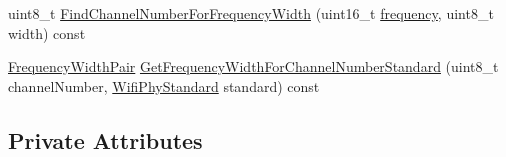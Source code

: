 \begin{DoxyCompactItemize}
\item 
uint8\+\_\+t \hyperlink{classns3_1_1WifiPhy_ac1a2644035e5ec7129ec1a1583face8a}{Find\+Channel\+Number\+For\+Frequency\+Width} (uint16\+\_\+t \hyperlink{mmwave_2model_2fading-traces_2fading__trace__generator_8m_a09045328d6d7e16aa4013f526cc6993d}{frequency}, uint8\+\_\+t width) const 
\item 
\hyperlink{classns3_1_1WifiPhy_abb7b47ebed22c2703bcc239729d1e40c}{Frequency\+Width\+Pair} \hyperlink{classns3_1_1WifiPhy_ad4ffecf66d648b47d62ad73143a3fcbc}{Get\+Frequency\+Width\+For\+Channel\+Number\+Standard} (uint8\+\_\+t channel\+Number, \hyperlink{group__wifi_ga1299834f4e1c615af3ca738033b76a49}{Wifi\+Phy\+Standard} standard) const 
\end{DoxyCompactItemize}
\subsection*{Private Attributes}
